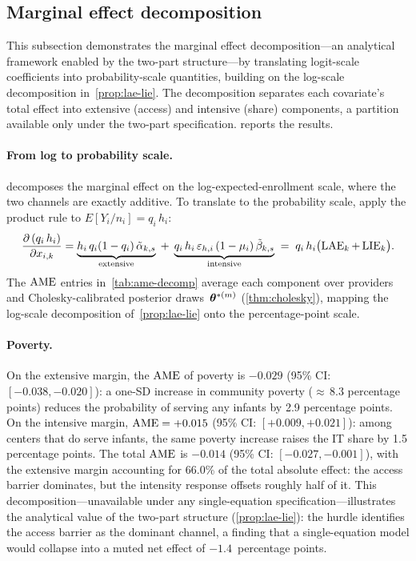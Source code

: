 \subsection{Marginal effect decomposition}\label{sec:ame}

This subsection demonstrates the marginal effect decomposition---an
analytical framework enabled by the two-part structure---by translating
logit-scale coefficients into probability-scale quantities, building on
the log-scale decomposition in~\cref{prop:lae-lie}.  The decomposition
separates each covariate's total effect into extensive (access) and
intensive (share) components, a partition available only under the
two-part specification.   reports the results.

\paragraph{From log to probability scale.}
 decomposes the marginal effect on the
log-expected-enrollment scale, where the two channels are exactly
additive.  To translate to the probability scale, apply the product
rule to $E[Y_i/n_i] = q_i\,h_i$:
\begin{equation}\label{eq:ame-bridge}
  \frac{\partial\,(q_i\,h_i)}{\partial x_{i,k}}
  = \underbrace{h_i\,q_i(1-q_i)\,\tilde{\alpha}_{k,s}}_{\text{extensive}}
  \;+\;
  \underbrace{q_i\,h_i\,\varepsilon_{h,i}\,(1-\mu_i)\,
             \tilde{\beta}_{k,s}}_{\text{intensive}}
  \;=\; q_i\,h_i\bigl(\operatorname{LAE}_k + \operatorname{LIE}_k\bigr).
\end{equation}
The $\text{AME}$ entries in~\cref{tab:ame-decomp} average each component
over providers and Cholesky-calibrated posterior
draws~$\boldsymbol{\theta}^{*(m)}$ (\cref{thm:cholesky}), mapping the log-scale
decomposition of~\cref{prop:lae-lie} onto the percentage-point scale.

\paragraph{Poverty.}
On the extensive margin, the $\text{AME}$ of poverty is
$-0.029$ (95\% CI: $[-0.038, -0.020]$): a one-SD increase
in community poverty (${\approx}\,8.3$ percentage points)
reduces the probability of serving any infants by 2.9
percentage points.  On the intensive margin, $\text{AME} = +0.015$
(95\% CI: $[+0.009, +0.021]$): among centers that do serve
infants, the same poverty increase raises the IT share by
1.5 percentage points.  The total $\text{AME}$ is $-0.014$
(95\% CI: $[-0.027, -0.001]$), with the extensive margin
accounting for 66.0\% of the total absolute effect: the access
barrier dominates, but the intensity response offsets roughly
half of it.  This decomposition---unavailable under any
single-equation specification---illustrates the analytical
value of the two-part structure (\cref{prop:lae-lie}): the
hurdle identifies the access barrier as the dominant channel,
a finding that a single-equation model would collapse into a
muted net effect of $-1.4$~percentage points.

